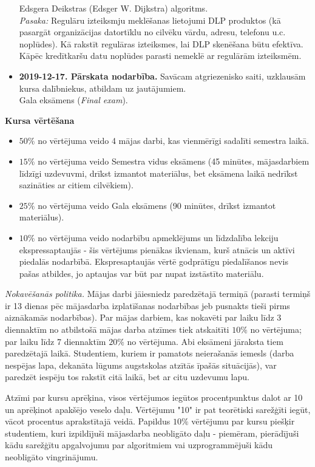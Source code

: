 \documentclass[11pt]{article}
\begin{document}
\begin{itemize}
Edsgera Deikstras (Edsger W. Dijkstra) algoritms.\\
{\em Pasaka:} Regulāru izteiksmju meklēšanas lietojumi DLP produktos (kā pasargāt organizācijas datortīklu no 
cilvēku vārdu, adresu, telefonu u.c. noplūdes). Kā rakstīt regulāras izteiksmes, lai DLP skenēšana būtu efektīva. 
Kāpēc kredītkaršu datu noplūdes parasti nemeklē ar regulārām izteiksmēm.
\item {\bf 2019-12-17. Pārskata nodarbība.} Savācam atgriezenisko saiti, uzklausām kursa dalībniekus, atbildam uz jautājumiem.\\
Gala eksāmens ({\em Final exam}).
\end{itemize}

\vspace{10pt}
{\large \bf Kursa vērtēšana}

\begin{itemize}
\item $50\%$ no vērtējuma veido 4 mājas darbi, kas vienmērīgi sadalīti semestra laikā.
\item $15\%$ no vērtējuma veido Semestra vidus eksāmens (45 minūtes, mājasdarbiem līdzīgi uzdevuvmi, drīkst izmantot materiālus, bet eksāmena laikā nedrīkst sazināties ar citiem cilvēkiem).
\item $25\%$ no vērtējuma veido Gala eksāmens (90 minūtes, drīkst izmantot materiālus).
\item $10\%$ no vērtējuma veido nodarbību apmeklējums un līdzdalība lekciju ekspressaptaujās - šis vērtējums pienākas ikvienam, kurš atnācis un aktīvi piedalās nodarbībā. Ekspresaptaujās vērtē godprātīgu piedalīšanos nevis pašas atbildes, jo aptaujas var būt par nupat izstāstīto materiālu.
\end{itemize}

{\em Nokavēšanās politika.} Mājas darbi jāiesniedz paredzētajā termiņā (parasti termiņš ir 13 dienas pēc mājasdarba izplatīšanas nodarbības jeb pusnakts tieši pirms aiznākamās nodarbības). Par mājas darbiem, 
kas nokavēti par laiku līdz 3 diennaktīm no atbilstošā mājas darba atzīmes tiek atskaitīti $10\%$ no vērtējuma; 
par laiku līdz 7 diennaktīm \textendash $20\%$ no vērtējuma. Abi eksāmeni jāraksta tiem paredzētajā laikā. 
Studentiem, kuriem ir pamatots neierašanās iemesls (darba nespējas lapa, dekanāta lūgums augstskolas 
atzītās īpašās situācijās), var paredzēt iespēju tos rakstīt citā laikā, bet ar citu uzdevumu lapu.

Atzīmi par kursu aprēķina, visos vērtējumos iegūtos procentpunktus 
dalot ar 10 un aprēķinot apakšējo veselo daļu.
Vērtējumu "10" ir pat teorētiski sarežģīti iegūt, vācot procentus aprakstītajā veidā. 
Papildus $10\%$ vērtējumu par kursu piešķir studentiem, kuri izpildījuši mājasdarba 
neobligāto daļu - piemēram, pierādījuši kādu sarežģītu apgalvojumu par algoritmiem vai 
uzprogrammējuši kādu neobligāto vingrinājumu.
\end{document}
